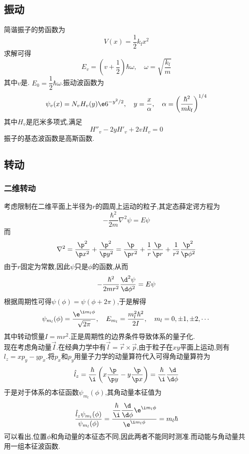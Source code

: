 \documentclass{ctexbook}
\begin{document}
\subsection{振动}
简谐振子的势函数为
\[V(x)=\dfrac12 k_\text{f}x^2\]
求解可得
\[E_v=\left(v+\dfrac12\right)\hbar\omega,\quad\omega=\sqrt{\dfrac{k_\text{f}}{m}}\]
其中$v$是. $E_0=\dfrac12\hbar\omega$.振动波函数为
\[\psi_v(x)=N_vH_v(y)\e6^{-y^2/2},\quad y=\dfrac{x}{\alpha},\quad\alpha=\left(\dfrac{\hbar^2}{mk_\text{f}}\right)^{1/4}\]
其中$H_v$是厄米多项式,满足
\[H''_v-2yH'_v+2vH_v=0\]
振子的基态波函数是高斯函数.
\subsection{转动}
\subsubsection{二维转动}
考虑限制在二维平面上半径为$r$的圆周上运动的粒子,其定态薛定谔方程为
\[-\dfrac{\hbar^2}{2m}\nabla^2\psi=E\psi\]
而
\[\nabla^2=\dfrac{\p^2}{\p x^2}+\dfrac{\p^2}{\p y^2}=\dfrac{\p}{\p r^2}+\dfrac1r\dfrac{\p}{\p r}+\dfrac{1}{r^2}\dfrac{\p^2}{\p\phi^2}\]
由于$r$固定为常数,因此$\psi$只是$\phi$的函数,从而
\[-\dfrac{\hbar^2}{2m r^2}\dfrac{\d^2\psi}{\d\phi^2}=E\psi\]
根据周期性可得$\psi(\phi)=\psi(\phi+2\pi)$,于是解得
\[\psi_{m_l}(\phi)=\dfrac{\e^{\i m_l\phi}}{\sqrt{2\pi}},\quad E_{m_l}=\dfrac{m_l^2\hbar^2}{2I},\quad m_l=0,\pm1,\pm2,\cdots\]
其中转动惯量$I=mr^2$.正是周期性的边界条件导致体系的量子化.\\
\indent 现在考虑角动量$\vec{I}$.在经典力学中有$\vec{l}=\vec{r}\times\vec{p}$,由于粒子在$xy$平面上运动,则有$l_z=xp_y-yp_x$.将$p_x$和$p_y$用量子力学的动量算符代入可得角动量算符为
\[\hat{l}_z=\dfrac{\hbar}{\i}\left(x\dfrac{\p}{\p y}-y\dfrac{\p}{\p x}\right)=\dfrac{\hbar}{\i}\dfrac{\d}{\d\phi}\]
于是对于体系的本征函数$\psi_{m_l}(\phi)$,其角动量本征值为
\[\dfrac{\hat{l}_z\psi_{m_l}(\phi)}{\psi_{m_l}(\phi)}=\dfrac{\dfrac{\hbar}{\i}\dfrac{\d}{\d\phi}\e^{\i m_l\phi}}{\e^{\i m_l\phi}}=m_l\hbar\]
\indent 可以看出,位置$\phi$和角动量的本征态不同,因此两者不能同时测准.而动能与角动量共用一组本征波函数.
\end{document}
